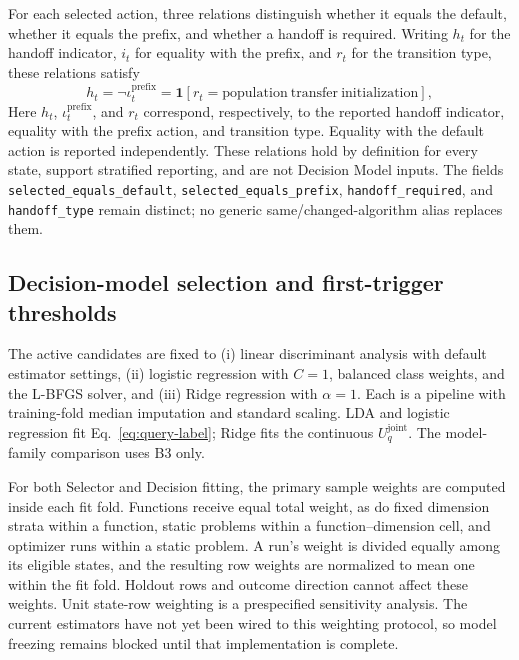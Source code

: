 For each selected action, three relations distinguish whether it equals the
default, whether it equals the prefix, and whether a handoff is required.
Writing $h_t$ for the handoff indicator, $i_t$ for equality with the prefix,
and $r_t$ for the transition type, these relations satisfy
\begin{equation}
  h_t=\neg \iota_t^{\mathrm{prefix}}
  =\mathbf{1}[r_t=\mathrm{population\ transfer\ initialization}],
  \label{eq:handoff-fields}
\end{equation}
Here $h_t$, $\iota_t^{\mathrm{prefix}}$, and $r_t$ correspond, respectively, to
the reported handoff indicator, equality with the prefix action, and transition
type.  Equality with the default action is reported independently.  These
relations hold by definition for every state, support stratified reporting,
and are not Decision Model inputs.  The fields
\texttt{selected\_equals\_default},
\texttt{selected\_equals\_prefix}, \texttt{handoff\_required}, and
\texttt{handoff\_type} remain distinct; no generic same/changed-algorithm alias
replaces them.

\subsection{Decision-model selection and first-trigger thresholds}

The active candidates are fixed to (i) linear discriminant analysis with
default estimator settings, (ii) logistic regression with $C=1$, balanced class
weights, and the L-BFGS solver, and (iii) Ridge regression with $\alpha=1$.
Each is a pipeline with training-fold median imputation and standard scaling.
LDA and logistic regression fit Eq.~\eqref{eq:query-label}; Ridge fits the
continuous $U_q^{\mathrm{joint}}$.  The model-family comparison uses B3 only.

For both Selector and Decision fitting, the primary sample weights are computed
inside each fit fold.  Functions receive equal total weight, as do fixed
dimension strata within a function, static problems within a
function--dimension cell, and optimizer runs within a static problem.  A run's
weight is divided equally among its eligible states, and the resulting row
weights are normalized to mean one within the fit fold.  Holdout rows and
outcome direction cannot affect these weights.  Unit state-row weighting is a
prespecified sensitivity analysis.  The current estimators have not yet been
wired to this weighting protocol, so model freezing remains blocked until that
implementation is complete.

